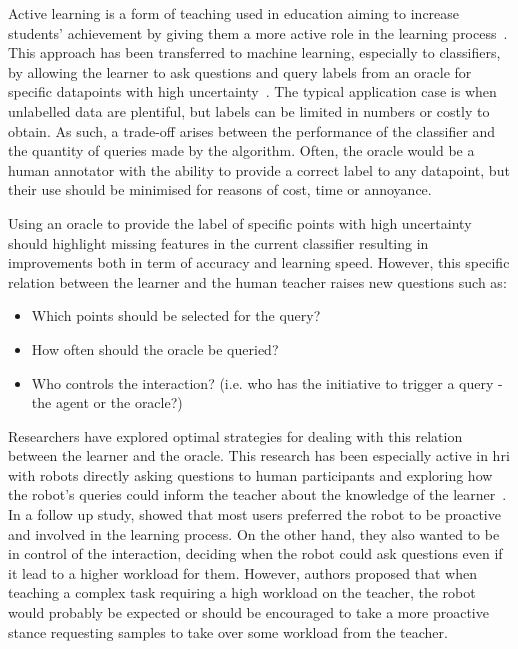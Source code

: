 Active learning is a form of teaching used in education aiming to increase students' achievement by giving them a more active role in the learning process~\citep{johnson1991active}. This approach has been transferred to machine learning, especially to classifiers, by allowing the learner to ask questions and query labels from an oracle for specific datapoints with high uncertainty~\citep{settles2012active}. The typical application case is when unlabelled data are plentiful, but labels can be limited in numbers or costly to obtain. As such, a trade-off arises between the performance of the classifier and the quantity of queries made by the algorithm. Often, the oracle would be a human annotator with the ability to provide a correct label to any datapoint, but their use should be minimised for reasons of cost, time or annoyance.

Using an oracle to provide the label of specific points with high uncertainty should highlight missing features in the current classifier resulting in improvements both in term of accuracy and learning speed. However, this specific relation between the learner and the human teacher raises new questions such as: 
\begin{itemize}
	\item Which points should be selected for the query?
	\item How often should the oracle be queried?
	\item Who controls the interaction? (i.e. who has the initiative to trigger a query - the agent or the oracle?)
\end{itemize}

Researchers have explored optimal strategies for dealing with this relation between the learner and the oracle. This research has been especially active in \gls{hri} with robots directly asking questions to human participants and exploring how the robot's queries could inform the teacher about the knowledge of the learner~\citep{chao2010transparent}. In a follow up study, \cite{cakmak2010designing} showed that most users preferred the robot to be proactive and involved in the learning process. On the other hand, they also wanted to be in control of the interaction, deciding when the robot could ask questions even if it lead to a higher workload for them. However, authors proposed that when teaching a complex task requiring a high workload on the teacher, the robot would probably be expected or should be encouraged to take a more proactive stance requesting samples to take over some workload from the teacher.

